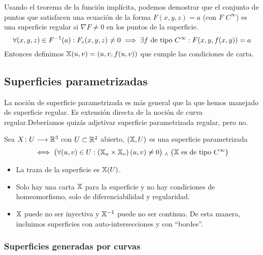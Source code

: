 Usando el teorema de la función implícita, podemos demostrar que el conjunto de puntos que satisfacen una ecuación de la forma $F(x, y, z) = a$ (con $F$ $C^\infty$) es una superficie regular si $\nabla F \neq 0$ en los puntos de la superficie.
\[\forall (x,y,z) \in F^{-1}(a) : F_z(x,y,z) \neq 0 \implies \exists f \text{ de tipo } C^\infty : F(x, y, f(x, y)) = a\]
Entonces definimos $\mathbb{X}(u, v) = (u, v, f(u, v))$ que cumple las condiciones de carta.

\subsection{Superficies parametrizadas}

La noción de superficie parametrizada es más general que la que hemos
manejado de superficie regular. Es extensión directa de la noción de curva regular.Deberíamos quizás adjetivar superficie parametrizada regular, pero no.

\begin{defn}
	Sea $X \colon U \longrightarrow \mathbb{R}^3$ con $U \subset \mathbb{R}^2$ abierto, $\left(\mathbb{X}, U\right)$ es una superficie parametrizada
	\[\iff \big(\forall (u, v) \in U : \left(\mathbb{X}_u \times \mathbb{X}_v\right)(u, v) \neq 0\big) \; _{\wedge} \; \big(\mathbb{X} \text{ es de tipo } C^\infty\big)\]
\end{defn}

\begin{obs}
	\begin{itemize}
		\item La traza de la superficie es $\mathbb{X}(U)$.
		\item Solo hay una carta $\mathbb{X}$ para la superficie y no hay condiciones de homeomorfismo, solo de diferenciabilidad y regularidad.
		\item $\mathbb{X}$ puede no ser inyectiva y $\mathbb{X}^{-1}$ puede no ser continua. De esta manera, incluimos superficies con auto-intersecciones y con ``bordes''.
	\end{itemize}
\end{obs}

\subsubsection{Superficies generadas por curvas}

